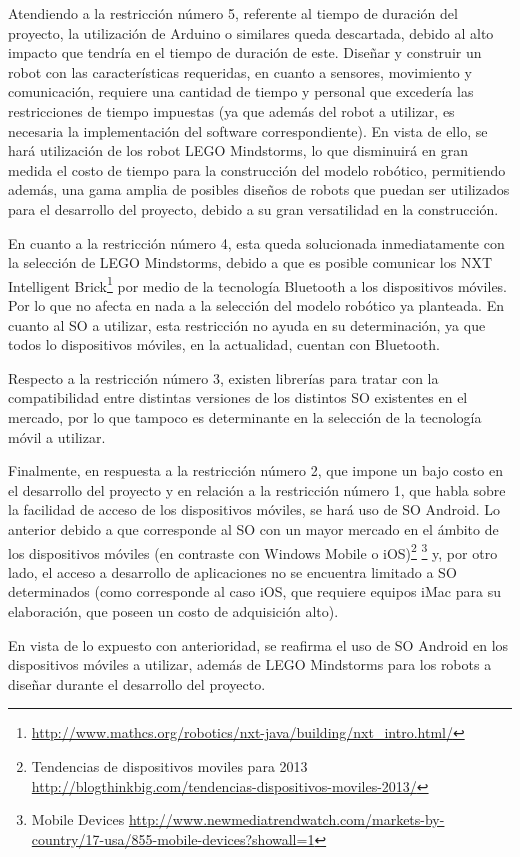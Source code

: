 Atendiendo a la restricci\'on n\'umero 5, referente al tiempo de duraci\'on del proyecto, la utilizaci\'on de Arduino o similares queda descartada, debido al alto impacto que tendr\'ia en el tiempo de duraci\'on de este. Dise\~nar y construir un robot con las caracter\'isticas requeridas, en cuanto a sensores, movimiento y comunicaci\'on, requiere una cantidad de tiempo y personal que exceder\'ia las restricciones de tiempo impuestas (ya que adem\'as del robot a utilizar, es necesaria la implementaci\'on del software correspondiente). En vista de ello, se har\'a utilizaci\'on de los robot LEGO Mindstorms, lo que disminuir\'a en gran medida el costo de tiempo para la construcci\'on del modelo rob\'otico, permitiendo adem\'as, una gama amplia de posibles dise\~nos de robots que puedan ser utilizados para el desarrollo del proyecto, debido a su gran versatilidad en la construcci\'on.

En cuanto a la restricci\'on n\'umero 4, esta queda solucionada inmediatamente con la selecci\'on de LEGO Mindstorms, debido a que es posible comunicar los NXT Intelligent Brick\footnote{\url{http://www.mathcs.org/robotics/nxt-java/building/nxt_intro.html/}} por medio de la tecnolog\'ia Bluetooth a los dispositivos m\'oviles. Por lo que no afecta en nada a la selecci\'on del modelo rob\'otico ya planteada. En cuanto al SO a utilizar, esta restricci\'on no ayuda en su determinaci\'on, ya que todos lo dispositivos m\'oviles, en la actualidad, cuentan con Bluetooth.

Respecto a la restricci\'on n\'umero 3, existen librer\'ias para tratar con la compatibilidad entre distintas versiones de los distintos SO existentes en el mercado, por lo que tampoco es determinante en la selecci\'on de la tecnolog\'ia m\'ovil a utilizar.

Finalmente, en respuesta a la restricci\'on n\'umero 2, que impone un bajo costo en el desarrollo del proyecto y en relaci\'on a la restricci\'on n\'umero 1, que habla sobre la facilidad de acceso de los dispositivos m\'oviles, se har\'a uso de SO Android. Lo anterior debido a que corresponde al SO con un mayor mercado en el \'ambito de los dispositivos m\'oviles (en contraste con Windows Mobile o iOS)\footnote{Tendencias de dispositivos moviles para 2013 \url{http://blogthinkbig.com/tendencias-dispositivos-moviles-2013/}} \footnote{Mobile Devices \url{http://www.newmediatrendwatch.com/markets-by-country/17-usa/855-mobile-devices?showall=1}} y, por otro lado, el acceso a desarrollo de aplicaciones no se encuentra limitado a SO determinados (como corresponde al caso iOS, que requiere equipos iMac para su elaboraci\'on, que poseen un costo de adquisici\'on alto).

En vista de lo expuesto con anterioridad, se reafirma el uso de SO Android en los dispositivos m\'oviles a utilizar, adem\'as de LEGO Mindstorms para los robots a dise\~nar durante el desarrollo del proyecto.
